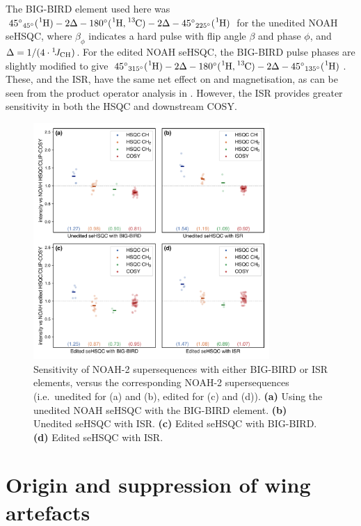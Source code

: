 The BIG-BIRD element used here was ${45^\circ}_{45^\circ}(\proton{}) - 2\Delta - 180^\circ(\proton{},\carbon{}) - 2\Delta - {45^\circ}_{225^\circ}(\proton{})$ for the unedited NOAH seHSQC, where $\beta_\phi$ indicates a hard pulse with flip angle $\beta$ and phase $\phi$, and $\Delta = 1/(4\cdot\onejch)$.
For the edited NOAH seHSQC, the BIG-BIRD pulse phases are slightly modified to give ${45^\circ}_{315^\circ}(\proton{}) - 2\Delta - 180^\circ(\proton{},\carbon{}) - 2\Delta - {45^\circ}_{135^\circ}(\proton{})$.
These, and the ISR, have the same net effect on  and  magnetisation, as can be seen from the product operator analysis in .
However, the ISR provides greater sensitivity in both the HSQC and downstream COSY.

\begin{figure}
    \centering
    \includegraphics[width=0.8\textwidth]{./figures/bigbird.png}
    \caption{
        Sensitivity of NOAH-2  supersequences with either BIG-BIRD or ISR elements, versus the corresponding NOAH-2  supersequences (i.e.\ unedited for (a) and (b), edited for (c) and (d)).
        \textbf{(a)} Using the unedited NOAH seHSQC with the BIG-BIRD element.
        \textbf{(b)} Unedited seHSQC with ISR.
        \textbf{(c)} Edited seHSQC with BIG-BIRD.
        \textbf{(d)} Edited seHSQC with ISR.
        \andro{}
    }
    \label{fig:bigbird}
\end{figure}


\section{Origin and suppression of wing artefacts}

